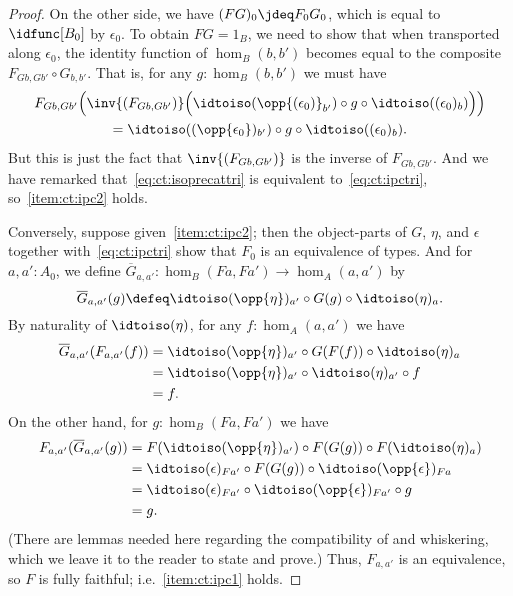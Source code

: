 \begin{proof}
  On the other side, we have $(FG)_0\jdeq F_0 G_0$, which is equal to $\idfunc[B_0]$ by $\epsilon_0$.
  To obtain $FG=1_B$, we need to show that when transported along $\epsilon_0$, the identity function of $\hom_B(b,b')$ becomes equal to the composite $F_{Gb,Gb'} \circ G_{b,b'}$.
  That is, for any $g:\hom_B(b,b')$ we must have
  \begin{multline*}
    F_{Gb,Gb'}\Big(\inv{(F_{Gb,Gb'})}\Big(\idtoiso(\opp{(\epsilon_0)}_{b'}) \circ g \circ \idtoiso((\epsilon_0)_b)\Big)\Big)\\
    = \idtoiso((\opp{\epsilon_0})_{b'}) \circ g \circ \idtoiso((\epsilon_0)_b).
  \end{multline*}
  But this is just the fact that $\inv{(F_{Gb,Gb'})}$ is the inverse of $F_{Gb,Gb'}$.
  And we have remarked that~\eqref{eq:ct:isoprecattri} is equivalent to~\eqref{eq:ct:ipctri}, so~\ref{item:ct:ipc2} holds.

  Conversely, suppose given~\ref{item:ct:ipc2}; then the object-parts of $G$, $\eta$, and $\epsilon$ together with~\eqref{eq:ct:ipctri} show that $F_0$ is an equivalence of types.
  And for $a,a':A_0$, we define $\overline{G}_{a,a'}: \hom_B(Fa,Fa') \to \hom_A(a,a')$ by
  \begin{equation}
    \overline{G}_{a,a'}(g) \defeq \idtoiso(\opp{\eta})_{a'} \circ G(g) \circ \idtoiso(\eta)_a.\label{eq:ct:gbar}
  \end{equation}
  By naturality of $\idtoiso(\eta)$, for any $f:\hom_A(a,a')$ we have
  \begin{align*}
    \overline{G}_{a,a'}(F_{a,a'}(f))
    &= \idtoiso(\opp{\eta})_{a'} \circ G(F(f)) \circ \idtoiso(\eta)_a\\
    &= \idtoiso(\opp{\eta})_{a'} \circ \idtoiso(\eta)_{a'} \circ f \\
    &= f.
  \end{align*}
  On the other hand, for $g:\hom_B(Fa,Fa')$ we have
  \begin{align*}
    F_{a,a'}(\overline{G}_{a,a'}(g))
    &= F(\idtoiso(\opp{\eta})_{a'}) \circ F(G(g)) \circ F(\idtoiso(\eta)_a)\\
    &= \idtoiso(\epsilon)_{Fa'}
    \circ F(G(g))
    \circ \idtoiso(\opp{\epsilon})_{Fa}\\
    &= \idtoiso(\epsilon)_{Fa'}
    \circ \idtoiso(\opp{\epsilon})_{Fa'}
    \circ g\\
    &= g.
  \end{align*}
  (There are lemmas needed here regarding the compatibility of \idtoiso and whiskering, which we leave it to the reader to state and prove.)
  Thus, $F_{a,a'}$ is an equivalence, so $F$ is fully faithful; i.e.~\ref{item:ct:ipc1} holds.


\end{proof}
